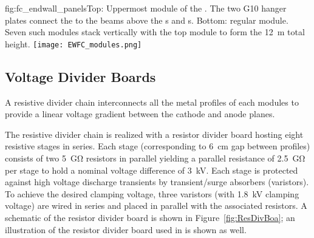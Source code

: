 \begin{dunefigure}{fig:fc_endwall_panels}{Top: Uppermost module of the . The two G10 hanger plates connect the  to the  beams above the s and s. Bottom: regular  module. Seven such modules stack vertically with the top module to form the \SI{12}{m} total height.}
\texttt{[image: EWFC\_modules.png]}
\end{dunefigure}


\subsection{Voltage Divider Boards}
A resistive divider chain interconnects all the metal profiles of each  modules to provide a linear voltage gradient between the cathode and anode planes.

The resistive divider chain is realized with a resistor divider board hosting eight resistive stages in series. Each stage (corresponding to \SI{6}{cm} gap between  profiles)  consists of two \SI{5}{\giga\ohm} resistors in parallel yielding a parallel resistance of \SI{2.5}{\giga\ohm} per stage to hold a nominal voltage difference of \SI{3}{kV}. Each stage is protected against high voltage discharge transients by transient/surge absorbers (varistors). To achieve the desired clamping voltage, three varistors (with \SI{1.8}{kV} clamping voltage) are wired in series and placed in parallel with the associated resistors. A schematic of the resistor divider board is shown in Figure~\ref{fig:ResDivBoa}; an illustration of the resistor divider board used in  is shown as well.

